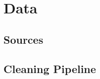 %

\section{Data}
\label{sec:data}


\subsection{Sources}
\label{subsec:data_sources}


\subsection{Cleaning Pipeline}
\label{subsec:data_cleaning}

